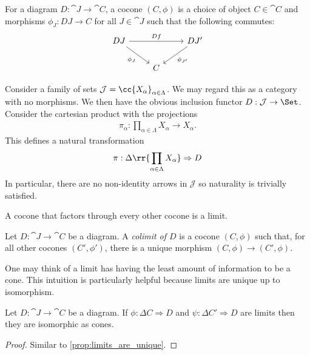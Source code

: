 \documentclass{article}
\begin{document}
For a diagram $D:\cat{J}\to\cat{C}$, a cocone $(C,\phi)$ is a choice of object
$C\in\cat{C}$ and morphisms $\phi_J:DJ\to C$ for all $J\in\cat{J}$ such that
the following commutes:
\begin{equation}
  \begin{tikzcd}
    DJ && {DJ'} \\
       & C
       \arrow["Df", from=1-1, to=1-3]
       \arrow["{\phi_{J'}}", from=1-3, to=2-2]
       \arrow["{\phi_J}"', from=1-1, to=2-2]
  \end{tikzcd}
\end{equation}

\begin{example}
  Consider a family of sets $\mathcal J=\cc{X_\alpha}_{\alpha\in\Lambda}$. We may
  regard this as a category with no morphisms. We then have
  the obvious inclusion functor $D:\mathcal J\to\Set$. Consider the cartesian
  product with the projections
  \begin{align*}
    \pi_\alpha : \prod_{\alpha\in\Lambda} X_\alpha \to X_\alpha.
  \end{align*}
  This defines a natural transformation
  \begin{align*}
    \pi : \Delta\rr{\prod_{\alpha\in\Lambda} X_\alpha}\Rightarrow D
  \end{align*}
  In particular, there are no non-identity arrows in $\mathcal J$ so
  naturality is trivially satisfied.
\end{example}

A cocone that factors through every other cocone is a limit.

\begin{definition}
  Let $D:\cat{J}\to\cat{C}$ be a diagram. A \emph{colimit of $D$} is a cocone
  $(C,\phi)$ such that, for all other cocones $(C',\phi')$, there is a unique morphism
  $(C,\phi)\to(C',\phi)$.
\end{definition}

One may think of a limit has having the least amount of information to be a cone.
This intuition is particularly helpful because limits are unique up to isomorphism.

\begin{proposition}
  Let $D:\cat{J}\to\cat{C}$ be a diagram. If $\phi:\Delta C\Rightarrow D$
  and $\psi:\Delta C'\Rightarrow D$ are limits then they are isomorphic as cones.
  \begin{proof}
    Similar to \ref{prop:limits_are_unique}.
  \end{proof}
\end{proposition}
\end{document}
